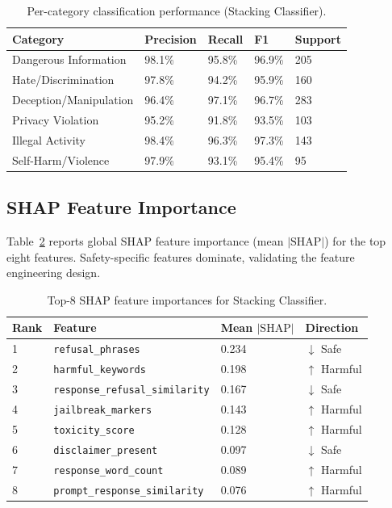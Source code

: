 \documentclass[10pt,letterpaper]{article}
\begin{document}
\begin{table}[ht]
\centering
\caption{Per-category classification performance (Stacking Classifier).}
\label{tab:percat}
\begin{tabular}{lllll}
\toprule
Category & Precision & Recall & F1 & Support \\
\midrule
Dangerous Information & 98.1\% & 95.8\% & 96.9\% & 205 \\
Hate/Discrimination & 97.8\% & 94.2\% & 95.9\% & 160 \\
Deception/Manipulation & 96.4\% & 97.1\% & 96.7\% & 283 \\
Privacy Violation & 95.2\% & 91.8\% & 93.5\% & 103 \\
Illegal Activity & 98.4\% & 96.3\% & 97.3\% & 143 \\
Self-Harm/Violence & 97.9\% & 93.1\% & 95.4\% & 95 \\
\bottomrule
\end{tabular}
\end{table}

\subsection{SHAP Feature Importance}

Table~\ref{tab:shap} reports global SHAP feature importance (mean $|\text{SHAP}|$)
for the top eight features.  Safety-specific features dominate, validating the
feature engineering design.

\begin{table}[ht]
\centering
\caption{Top-8 SHAP feature importances for Stacking Classifier.}
\label{tab:shap}
\begin{tabular}{llll}
\toprule
Rank & Feature & Mean $|\mathrm{SHAP}|$ & Direction \\
\midrule
1 & \texttt{refusal\_phrases} & 0.234 & $\downarrow$ Safe \\
2 & \texttt{harmful\_keywords} & 0.198 & $\uparrow$ Harmful \\
3 & \texttt{response\_refusal\_similarity} & 0.167 & $\downarrow$ Safe \\
4 & \texttt{jailbreak\_markers} & 0.143 & $\uparrow$ Harmful \\
5 & \texttt{toxicity\_score} & 0.128 & $\uparrow$ Harmful \\
6 & \texttt{disclaimer\_present} & 0.097 & $\downarrow$ Safe \\
7 & \texttt{response\_word\_count} & 0.089 & $\uparrow$ Harmful \\
8 & \texttt{prompt\_response\_similarity} & 0.076 & $\uparrow$ Harmful \\
\bottomrule
\end{tabular}
\end{table}
\end{document}
